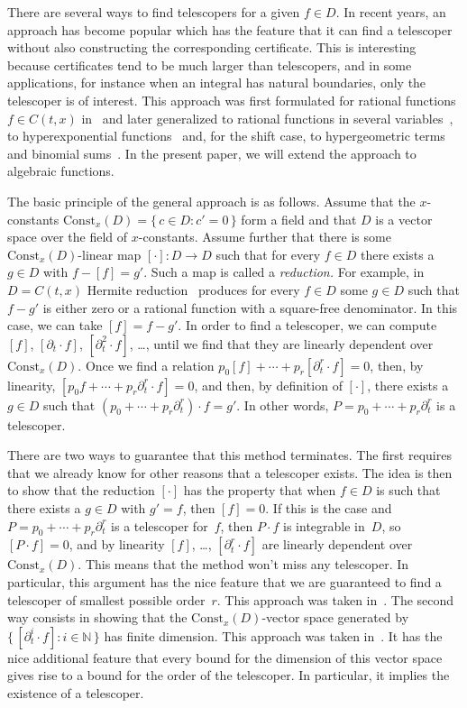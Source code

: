 \documentclass{sig-alternate}
\let\set\mathbb
\begin{document}
There are several ways to find telescopers for a given $f\in D$. In recent
years, an approach has become popular which has the feature that it can find a
telescoper without also constructing the corresponding certificate. This is
interesting because certificates tend to be much larger than telescopers, and in
some applications, for instance when an integral has natural boundaries, only the
telescoper is of interest. This approach was first formulated for rational
functions $f\in C(t,x)$ in~\cite{BCCL2010} and later generalized to rational
functions in several variables~\cite{bostan13, lairez15}, to hyperexponential
functions~\cite{bostan13a} and, for the shift case, to hypergeometric
terms~\cite{chen15a,huang16} and binomial sums~\cite{bostan15}. In the present paper, we
will extend the approach to algebraic functions.

The basic principle of the general approach is as follows. Assume that the
$x$-constants $\mathrm{Const}_x(D)=\{\,c\in D:c'=0\,\}$ form a field and that $D$
is a vector space over the field of $x$-constants. Assume further that there is
some $\mathrm{Const}_x(D)$-linear map $[\cdot]\colon D\to D$ such that for every
$f\in D$ there exists a $g\in D$ with $f-[f]=g'$. Such a map is called a
\emph{reduction.} For example, in $D=C(t,x)$ Hermite reduction~\cite{Hermite1872} produces for
every $f\in D$ some $g\in D$ such that $f-g'$ is either zero or a rational function
with a square-free denominator. In this case, we can take $[f]=f-g'$.
In order to find a telescoper, we can compute $[f]$, $[\partial_t\cdot f]$, $[\partial_t^2\cdot f]$, \dots,
until we find that they are linearly dependent over $\mathrm{Const}_x(D)$.
Once we find a relation
$p_0[f] + \cdots + p_r[\partial_t^r\cdot f] = 0$,
then, by linearity,
$[p_0 f + \cdots + p_r \partial_t^r\cdot f] = 0$,
and then, by definition of $[\cdot]$, there exists a $g\in D$ such that $(p_0+\cdots + p_r\partial_t^r)\cdot f=g'$.
In other words, $P=p_0+\cdots + p_r\partial_t^r$ is a telescoper.

There are two ways to guarantee that this method terminates. The first requires that we already know for
other reasons that a telescoper exists. The idea is then to show that the
reduction $[\cdot]$ has the property that when $f\in D$ is such that there
exists a $g\in D$ with $g'=f$, then $[f]=0$. If this is the case and
$P=p_0+\cdots+p_r\partial_t^r$ is a telescoper for~$f$, then $P\cdot f$ is integrable
in~$D$, so $[P\cdot f]=0$, and by linearity $[f]$, \dots, $[\partial_t^r\cdot f]$ are
linearly dependent over $\mathrm{Const}_x(D)$. This means that the method won't
miss any telescoper. In particular, this argument has the nice feature that we
are guaranteed to find a telescoper of smallest possible order~$r$. This
approach was taken in~\cite{chen15a}.
The second way consists in showing that the $\mathrm{Const}_x(D)$-vector space generated
by $\{\,[\partial_t^i\cdot f]:i\in\set N\,\}$
has finite dimension. This approach was taken in~\cite{BCCL2010,bostan13a}. It has the
nice additional feature that every bound for the dimension of this vector space
gives rise to a bound for the order of the telescoper. In particular, it implies
the existence of a telescoper.
\end{document}
